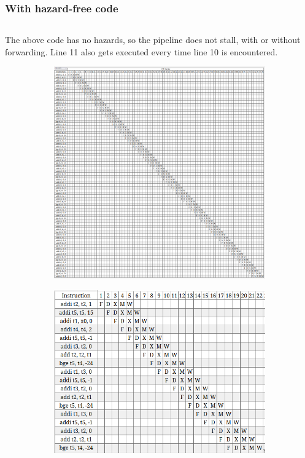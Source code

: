 \documentclass[11pt]{article}
\newenvironment{codeblock}{\captionsetup{type=codelisting}}{}
\begin{document}
\subsubsection{With hazard-free code}
\begin{codeblock}
\inputminted[breaklines,
 mathescape,
 linenos,
 numbersep=5pt,
 frame=single,
 xleftmargin=0pt]{asm}{q1/fib-bdex.S}
\end{codeblock}

The above code has no hazards, so the pipeline does not stall, with or without forwarding. Line 11 also gets executed every time line 10 is encountered.

\begin{figure}[H]
\begin{subfigure}{.5\textwidth}
  \centering
  \includegraphics[width=\linewidth]{q1/bex/good/full-78.png}
\end{subfigure}
\begin{subfigure}{.5\textwidth}
  \centering
  \includegraphics[width=\linewidth]{q1/bex/good/loop.png}

\end{subfigure}
\end{figure}
\end{document}
